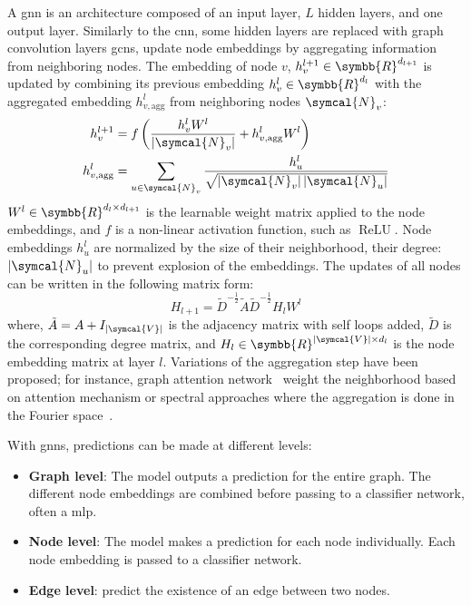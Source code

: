 \documentclass[../main.tex]{subfiles}
\begin{document}
		A \gls{gnn} is an architecture composed of an input layer, \(L\) hidden layers, and one output layer.
		Similarly to the \gls{cnn}, some hidden layers are replaced with graph convolution layers
		\Glspl{gcn}, update node embeddings by aggregating information from neighboring nodes.
		The embedding of node \(v\), \(h^{l+1}_{v} \in \symbb{R}^{d_{l+1}}\) is updated by combining its previous embedding \(h^{l}_{v} \in \symbb{R}^{d_{l}}\) with the aggregated embedding \(h^{l}_{v,\text{agg}}\) from neighboring nodes \(\symcal{N}_{v}\):
		\begin{align}
			h^{l+1}_{v}          & = f\left( \frac{h^{l}_{v}W^{l}}{\left|\symcal{N}_{v} \right|} + h^{l}_{v,\text{agg}}W^{l}\right)                \\
			h^{l}_{v,\text{agg}} & = \sum_{u \in \symcal{N}_{v}} \frac{h^{l}_{u}}{\sqrt{\left|\symcal{N}_{v} \right|\left|\symcal{N}_{u} \right|}}
		\end{align}
		\(W^{l} \in \symbb{R}^{d_{l}\times d_{l+1}}\) is the learnable weight matrix applied to the node embeddings, and \(f\) is a non-linear activation function, such as \(\operatorname{ReLU}\).
		Node embeddings \(h_{u}^{l}\) are normalized by the size of their neighborhood, \ie{}their degree: \(\left|\symcal{N}_{u} \right|\) to prevent explosion of the embeddings.
		The updates of all nodes can be written in the following matrix form:
		\begin{equation}
			H_{l+1} = \tilde{D}^{-\tfrac12}\tilde{A}\tilde{D}^{-\tfrac12}H_{l}W^{l}
		\end{equation}
		where, \(\tilde{A} = A + I_{\left|\symcal{V}\right|}\) is the adjacency matrix with self loops added, \(\tilde{D}\) is the corresponding degree matrix, and \(H_{l} \in \symbb{R}^{\left|\symcal{V}\right| \times d_{l}}\) is the node embedding matrix at layer \(l\).
		Variations of the aggregation step have been proposed; for instance, graph attention network~\cite{velickovic2018graph} weight the neighborhood based on attention mechanism or spectral approaches where the aggregation is done in the Fourier space~\cite{ChebConv}.

		With \glspl{gnn}, predictions can be made at different levels:
		\begin{itemize}[nosep]
			\item \textbf{Graph level}: The model outputs a prediction for the entire graph.
				The different node embeddings are combined before passing to a classifier network, often a \gls{mlp}.
			\item \textbf{Node level}: The model makes a prediction for each node individually.
				Each node embedding is passed to a classifier network.
			\item \textbf{Edge level}: predict the existence of an edge between two nodes.
		\end{itemize}
\end{document}
